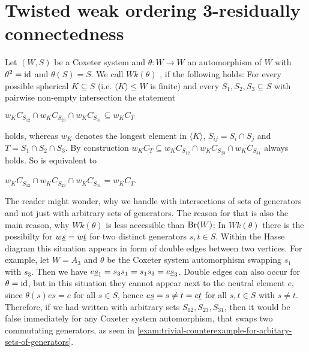 \chapter{Twisted weak ordering 3-residually connectedness}
\label{sec:main-thesis}

\begin{defi}
	Let $(W,S)$ be a Coxeter system and $\theta : W \to W$ an automorphism of $W$ with $\theta^2 = \operatorname{id}$ and $\theta(S) = S$. We call $Wk(\theta)$ , if the following holds: For every possible spherical $K \subseteq S$ (i.e. $\langle K \rangle \leq W$ is finite) and every $S_1,S_2,S_3 \subseteq S$ with pairwise non-empty intersection the statement
	\begin{axioms}
		 $w_K C_{S_{12}} \cap w_K C_{S_{23}} \cap w_K C_{S_{31}} \subseteq w_K C_T$
	\end{axioms}
	holds, whereas $w_K$ denotes the longest element in $\langle K \rangle$, $S_{ij} = S_i \cap S_j$ and $T = S_1 \cap S_2 \cap S_3$. By construction $w_K C_T \subseteq w_K C_{S_{12}} \cap w_K C_{S_{23}} \cap w_K C_{S_{31}}$ always holds. So  is equivalent to
	\begin{axioms}
		 $w_K C_{S_{12}} \cap w_K C_{S_{23}} \cap w_K C_{S_{31}} = w_K C_T$.
	\end{axioms}
\end{defi}

The reader might wonder, why we handle with intersections of sets of generators and not just with arbitrary sets of generators. The reason for that is also the main reason, why $Wk(\theta)$ is less accessible than $\operatorname{Br}(W)$: In $Wk(\theta)$ there is the possibilty for $w \underline{s} = w \underline{t}$ for two distinct generators $s,t \in S$. Within the Hasse diagram this situation appears in form of double edges between two vertices. For example, let $W = A_3$ and $\theta$ be the Coxeter system automorphism swapping $s_1$ with $s_3$. Then we have $e \underline{s}_1 = s_3 s_1 = s_1 s_3 = e \underline{s}_3$. Double edges can also occur for $\theta = \operatorname{id}$, but in this situation they cannot appear next to the neutral element $e$, since $\theta(s)es = e$ for all $s \in S$, hence $e \underline{s} = s \neq t = e \underline{t}$ for all $s,t \in S$ with $s \neq t$. Therefore, if we had written  with arbitrary sets $S_{12},S_{23},S_{31}$, then it would be false immediately for any Coxeter system automorphism, that swaps two commutating generators, as seen in \ref{exam:trivial-counterexample-for-arbitary-sets-of-generators}.

